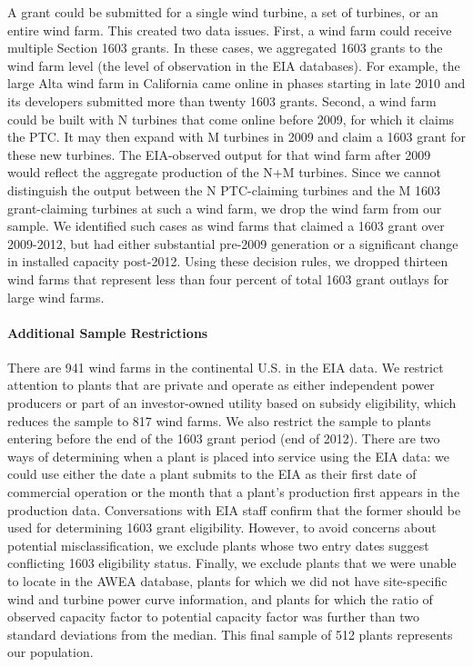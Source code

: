 \documentclass[12pt]{article}
\begin{document}
\begin{itemize}
A grant could be submitted for a single wind turbine, a set of turbines, or an entire wind farm. This created two data issues. First, a wind farm could receive multiple Section 1603 grants. In these cases, we aggregated 1603 grants to the wind farm level (the level of observation in the EIA databases). For example, the large Alta wind farm in California came online in phases starting in late 2010 and its developers submitted more than twenty 1603 grants. Second, a wind farm could be built with N turbines that come online before 2009, for which it claims the PTC. It may then expand with M turbines in 2009 and claim a 1603 grant for these new turbines. The EIA-observed output for that wind farm after 2009 would reflect the aggregate production of the N+M turbines. Since we cannot distinguish the output between the N PTC-claiming turbines and the M 1603 grant-claiming turbines at such a wind farm, we drop the wind farm from our sample. We identified such cases as wind farms that claimed a 1603 grant over 2009-2012, but had either substantial pre-2009 generation or a significant change in installed capacity post-2012. Using these decision rules, we dropped thirteen wind farms that represent less than four percent of total 1603 grant outlays for large wind farms. 
\end{itemize}

\paragraph*{Additional Sample Restrictions}

There are 941 wind farms in the continental U.S. in the EIA data. We restrict attention to plants that are private and operate as either independent power producers or part of an investor-owned utility based on subsidy eligibility, which reduces the sample to 817 wind farms. We also restrict the sample to plants entering before the end of the 1603 grant period (end of 2012). There are two ways of determining when a plant is placed into service using the EIA data: we could use either the date a plant submits to the EIA as their first date of commercial operation or the month that a plant's production first appears in the production data. Conversations with EIA staff confirm that the former should be used for determining 1603 grant eligibility. However, to avoid concerns about potential misclassification, we exclude plants whose two entry dates suggest conflicting 1603 eligibility status. Finally, we exclude plants that we were unable to locate in the AWEA database, plants for which we did not have site-specific wind and turbine power curve information, and plants for which the ratio of observed capacity factor to potential capacity factor was further than two standard deviations from the median. This final sample of 512 plants represents our population.
\end{document}
